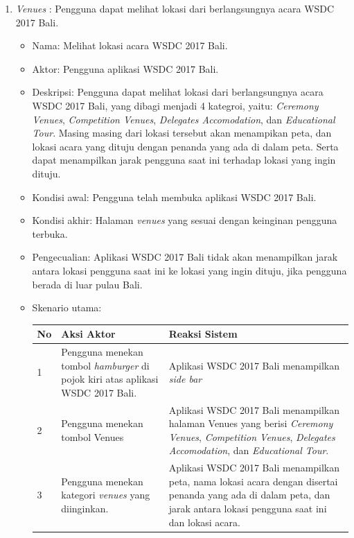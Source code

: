 \begin{enumerate}
	\item {\it Venues} : Pengguna dapat melihat lokasi dari berlangsungnya acara WSDC 2017 Bali.
	\begin{itemize}
		\item Nama: Melihat lokasi acara WSDC 2017 Bali.
		\item Aktor: Pengguna aplikasi WSDC 2017 Bali.
		\item Deskripsi: Pengguna dapat melihat lokasi dari berlangsungnya acara WSDC 2017 Bali, yang dibagi menjadi 4 kategroi, yaitu: {\it Ceremony Venues}, {\it Competition Venues}, {\it Delegates Accomodation}, dan {\it Educational Tour}. Masing masing dari lokasi tersebut akan menampikan peta, dan lokasi acara yang dituju dengan penanda yang ada di dalam peta. Serta dapat menampilkan jarak pengguna saat ini terhadap lokasi yang ingin dituju.
		\item Kondisi awal: Pengguna telah membuka aplikasi WSDC 2017 Bali.
		\item Kondisi akhir: Halaman {\it venues} yang sesuai dengan keinginan pengguna terbuka.
		\item Pengecualian: Aplikasi WSDC 2017 Bali tidak akan menampilkan jarak antara lokasi pengguna saat ini ke lokasi yang ingin dituju, jika pengguna berada di luar pulau Bali.
		\item Skenario utama: \\
		 \begin{table}[H]
			\centering
			\begin{tabular}{|p{0.5cm}|p{7cm}|p{7cm}|}
				\hline
				No & Aksi Aktor                               & Reaksi Sistem                                          \\ \hline
				1  & Pengguna menekan tombol {\it hamburger} di pojok kiri atas aplikasi WSDC 2017 Bali. & Aplikasi WSDC 2017 Bali menampilkan {\it side bar} \\ \hline
				2  & Pengguna menekan tombol Venues & Aplikasi WSDC 2017 Bali menampilkan halaman Venues yang berisi {\it Ceremony Venues}, {\it Competition Venues}, {\it Delegates Accomodation}, dan {\it Educational Tour}.\\ \hline
				3  & Pengguna menekan kategori {\it venues} yang diinginkan. & Aplikasi WSDC 2017 Bali menampilkan peta, nama lokasi acara dengan disertai penanda yang ada di dalam peta, dan jarak antara lokasi pengguna saat ini dan lokasi acara.\\ \hline
			\end{tabular}
		\end{table}

\end{itemize}
\end{enumerate}
